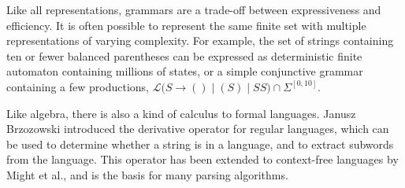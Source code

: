 Like all representations, grammars are a trade-off between expressiveness and efficiency. It is often possible to represent the same finite set with multiple representations of varying complexity. For example, the set of strings containing ten or fewer balanced parentheses can be expressed as deterministic finite automaton containing millions of states, or a simple conjunctive grammar containing a few productions, $\mathcal{L}\Big(S \rightarrow ( ) \mid (S) \mid S S \Big) \cap \Sigma^{[0,10]}$.

Like algebra, there is also a kind of calculus to formal languages. Janusz Brzozowski introduced the derivative operator for regular languages, which can be used to determine whether a string is in a language, and to extract subwords from the language. This operator has been extended to context-free languages by Might et al., and is the basis for many parsing algorithms.
\clearpage
